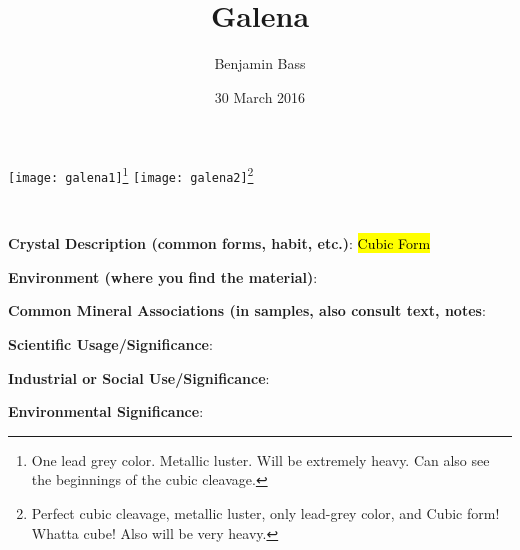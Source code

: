 \documentclass[10pt]{article}
\author{Benjamin Bass}
\date{30 March 2016}
\title{\vspace{-2.0cm}Galena} %
\begin{document}
\maketitle


\begin{center}
  \texttt{[image: galena1]}\footnote{One lead grey color. Metallic luster. Will be extremely heavy. Can also see the beginnings of the cubic cleavage.}
  \texttt{[image: galena2]}\footnote{Perfect cubic cleavage, metallic luster, only lead-grey color, and Cubic form! Whatta cube! Also will be very heavy.}
\end{center}



\
\
\
\
\
\
\
\
\
\

\begin{framed}
  \textbf{Crystal Description (common forms, habit, etc.)}: \hl{Cubic Form}
\end{framed}

\begin{framed}
  \textbf{Environment (where you find the material)}: 
\end{framed}

\begin{framed}
  \textbf{Common Mineral Associations (in samples, also consult text, notes}: 
\end{framed}

\begin{framed}
  \textbf{Scientific Usage/Significance}: 
\end{framed}

\begin{framed}
  \textbf{Industrial or Social Use/Significance}: 
\end{framed}

\begin{framed}
  \textbf{Environmental Significance}: 
\end{framed}

\end{document}
